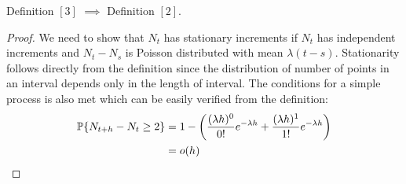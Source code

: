 \documentclass[all-lectures.tex]{subfiles}
\begin{document}
\begin{prop}[] 
Definition $[3]$ $\implies$ Definition $[2]$.
\begin{proof}
We need to show that $N_t$ has stationary increments if $N_t$  has independent increments and $N_t-N_s$ is Poisson distributed with mean $\lambda(t-s)$. Stationarity follows directly from the definition since the distribution of number of points in an interval depends only in the length of interval. The conditions for a simple process is also met which can be easily verified from the definition:
\begin{align*}
\P\{N_{t+h} - N_t \geq  2 \} &= 1- \left(\frac{(\lambda h)^0}{0!} e^{-\lambda h} + \frac{(\lambda h)^1}{1!} e^{-\lambda h}\right)\\
&= o(h)
\end{align*} 

\end{proof}
\end{prop}
\end{document}
